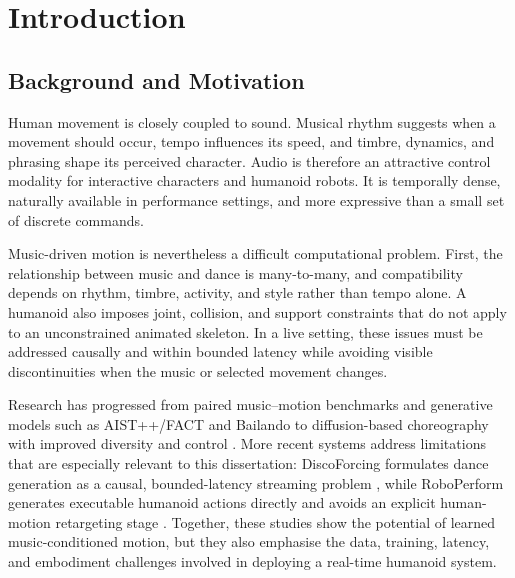 
\chapter{Introduction}
\label{chap:introduction}

\section{Background and Motivation}
\label{sec:intro_background}

Human movement is closely coupled to sound. Musical rhythm suggests when a
movement should occur, tempo influences its speed, and timbre, dynamics, and
phrasing shape its perceived character. Audio is therefore an attractive
control modality for interactive characters and humanoid robots. It is
temporally dense, naturally available in performance settings, and more
expressive than a small set of discrete commands.

Music-driven motion is nevertheless a difficult computational problem. First,
the relationship between music and dance is many-to-many, and compatibility
depends on rhythm, timbre, activity, and style rather than tempo alone. A
humanoid also imposes joint, collision, and support constraints that do not
apply to an unconstrained animated skeleton. In a live setting, these issues
must be addressed causally and within bounded latency while avoiding visible
discontinuities when the music or selected movement changes.

Research has progressed from paired music--motion benchmarks and generative
models such as AIST++/FACT and Bailando \cite{li2021ai,siyao2022bailando} to
diffusion-based choreography with improved diversity and control
\cite{alexanderson2023listen,tseng2023edge,li2023finedance,huang2024beat}.
More recent systems address limitations that are especially relevant to this
dissertation: DiscoForcing formulates dance generation as a causal,
bounded-latency streaming problem \cite{ji2026discoforcing}, while RoboPerform
generates executable humanoid actions directly and avoids an explicit
human-motion retargeting stage \cite{li2026you}. Together, these studies show
the potential of learned music-conditioned motion, but they also emphasise the
data, training, latency, and embodiment challenges involved in deploying a
real-time humanoid system.

